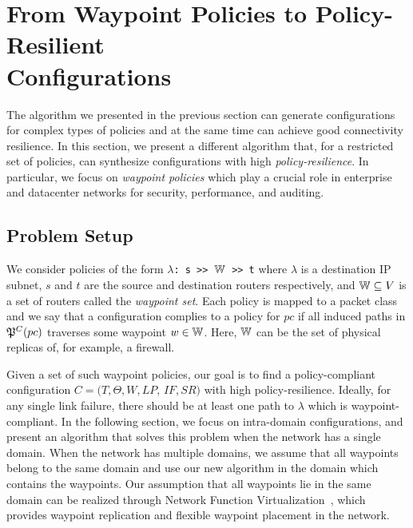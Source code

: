 \section{From Waypoint Policies to Policy-Resilient \\ Configurations}
\label{sec:waypointres}


The algorithm we presented in the previous section can generate configurations
for complex types of policies and at the same time can achieve good
connectivity resilience.
In this section, we present a different algorithm that, for a restricted set of policies,
can synthesize configurations with high \emph{policy-resilience}.
In particular, we focus on \emph{waypoint policies}
which play a crucial role in enterprise and
datacenter networks for security, performance,  
and auditing.

\subsection{Problem Setup}

We consider policies of the form 
\texttt{$\lambda$: s >> $\mathbb{W}$ >> t}
where $\lambda$ is a destination IP subnet,  
$s$ and $t$ are the source and destination routers respectively, 
and $\mathbb{W} \subseteq V$ is a set of routers called the \emph{waypoint set}. 
Each policy is mapped to a packet class and
we say that a configuration complies to a policy for $pc$ if 
all induced paths in $\mathfrak{P}^C(pc)$ 
traverses some waypoint $w \in \mathbb{W}$.
Here, $\mathbb{W}$
can be the set of physical replicas of,  for example, a firewall.


 Given a set of such waypoint policies, our goal is to
find a policy-compliant configuration 
$C=(T,\Theta,W,LP$, $IF,SR)$ 
with high policy-resilience. Ideally, for 
any single link failure, there should be at least 
one path to $\lambda$ which is waypoint-compliant. 
In the following section, we focus on 
intra-domain configurations,
and present an algorithm
that solves this problem when the network 
has a single domain.
When the network has multiple domains, 
we assume that all waypoints
belong to the same domain and
use our new algorithm in the domain 
which contains the waypoints.  
Our assumption that all waypoints lie in the 
same domain can be realized
through Network Function Virtualization~\cite{opennf, netbricks},
which provides waypoint replication and 
 flexible waypoint placement in the network.



